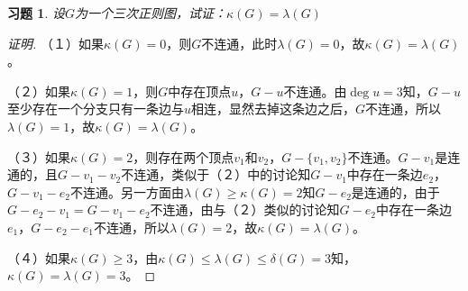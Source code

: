 \documentclass{article}
\begin{document}
\begin{CJK}{UTF8}{gbsn}
\newtheorem*{Exercise}{习题}
\begin{Exercise}
  设$G$为一个三次正则图，试证：$\kappa(G)=\lambda(G)$
\end{Exercise}
\begin{proof}[证明]
  （１）如果$\kappa(G)=0$，则$G$不连通，此时$\lambda(G)=0$，故$\kappa(G) = \lambda(G)$。

  （２）如果$\kappa(G)=1$，则$G$中存在顶点$u$，$G-u$不连通。由$\deg u=3$知，$G-u$至少存在一个分支只有一条边与$u$相连，显然去掉这条边之后，$G$不连通，所以$\lambda(G)=1$，故$\kappa(G)=\lambda(G)$。

  （３）如果$\kappa(G)=2$，则存在两个顶点$v_1$和$v_2$，$G-\{v_1,v_2\}$不连通。$G-v_1$是连通的，且$G-v_1-v_2$不连通，类似于（２）中的讨论知$G-v_1$中存在一条边$e_2$，$G-v_1-e_2$不连通。另一方面由$\lambda(G)\geq \kappa(G)=2$知$G-e_2$是连通的，由于$G-e_2-v_1=G-v_1-e_2$不连通，由与（２）类似的讨论知$G-e_2$中存在一条边$e_1$，$G-e_2-e_1$不连通，所以$\lambda(G)=2$，故$\kappa(G)=\lambda(G)$。

  （４）如果$\kappa(G)\geq 3$，由$\kappa(G) \leq \lambda(G) \leq \delta(G) = 3$知，$\kappa(G)=\lambda(G)=3$。
\end{proof}

\end{CJK}
\end{document}

